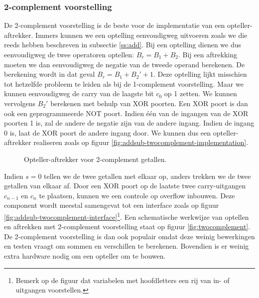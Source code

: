 \subsubsection{2-complement voorstelling}
De 2-complement voorstelling is de beste voor de implementatie van een opteller-aftrekker. Immers kunnen we een optelling eenvoudigweg uitvoeren zoals we die reeds hebben beschreven in subsectie \ref{ss:add}. Bij een optelling dienen we dus eenvoudigweg de twee operatoren optellen: $B_r=B_1+B_2$. Bij een aftrekking moeten we dan eenvoudigweg de negatie van de tweede operand berekenen. De berekening wordt in dat geval $B_r=B_1+B_2'+1$. Deze optelling lijkt misschien tot hetzelfde probleem te leiden als bij de 1-complement voorstelling. Maar we kunnen eenvoudigweg de carry van de laagste bit $c_0$ op 1 zetten. We kunnen vervolgens $B_2'$ berekenen met behulp van XOR poorten. Een XOR poort is dan ook een geprogrammeerde NOT poort. Indien \'e\'en van de ingangen van de XOR poorten 1 is, zal de andere de negatie zijn van de andere ingang. Indien de ingang 0 is, laat de XOR poort de andere ingang door. We kunnen dus een opteller-aftrekker realiseren zoals op figuur \ref{fig:addsub-twocomplement-implementation}.
\begin{figure}[hbt]
\centering
{}
\caption{Opteller-aftrekker voor 2-complement getallen.}
\end{figure}
Indien $s=0$ tellen we de twee getallen met elkaar op, anders trekken we de twee getallen van elkaar af. Door een XOR poort op de laatste twee carry-uitgangen $c_{n-1}$ en $c_n$ te plaatsen, kunnen we een controle op overflow inbouwen. Deze component wordt meestal samengevat tot een interface zoals op figuur \ref{fig:addsub-twocomplement-interface}\footnote{Bemerk op de figuur dat variabelen met hoofdletters een rij van in- of uitgangen voorstellen.}. Een schematische werkwijze van optellen en aftrekken met 2-complement voorstelling staat op figuur \ref{fig:twocomplement}. De 2-complement voorstelling is dan ook populair omdat deze weinig bewerkingen en testen vraagt om sommen en verschillen te berekenen. Bovendien is er weinig extra hardware nodig om een opteller om te bouwen.
